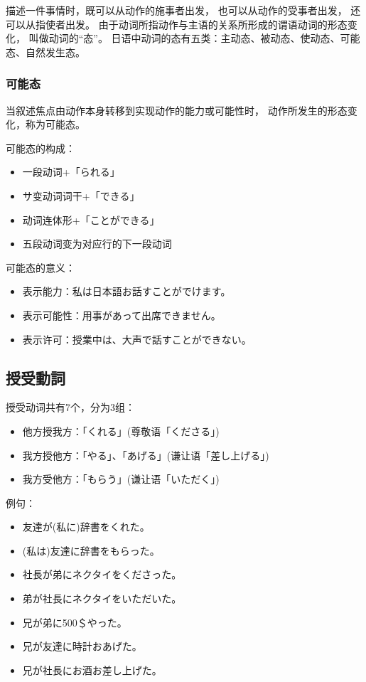 描述一件事情时，既可以从动作的施事者出发，
也可以从动作的受事者出发，
还可以从指使者出发。
由于动词所指动作与主语的关系所形成的谓语动词的形态变化，
叫做动词的``态''。
日语中动词的态有五类：主动态、被动态、使动态、可能态、自然发生态。

\subsubsection{可能态}%

当叙述焦点由动作本身转移到实现动作的能力或可能性时，
动作所发生的形态变化，称为可能态。

可能态的构成：
\begin{itemize}
  \item 一段动词+「られる」
  \item サ变动词词干+「できる」
  \item 动词连体形+「ことができる」
  \item 五段动词变为对应行的下一段动词
\end{itemize}

可能态的意义：
\begin{itemize}
  \item 表示能力：私は日本語お話すことがでけます。
  \item 表示可能性：用事があって出席できません。
  \item 表示许可：授業中は、大声で話すことができない。
\end{itemize}


\subsection{授受動詞}%

授受动词共有7个，分为3组：
\begin{itemize}
  \item 他方授我方：「くれる」(尊敬语「くださる」)
  \item 我方授他方：「やる」、「あげる」(谦让语「差し上げる」)
  \item 我方受他方：「もらう」(谦让语「いただく」)
\end{itemize}

例句：
\begin{itemize}
  \item 友達が(私に)辞書をくれた。
  \item (私は)友達に辞書をもらった。
  \item 社長が弟にネクタイをくださった。
  \item 弟が社長にネクタイをいただいた。
  \item 兄が弟に500＄やった。
  \item 兄が友達に時計おあげた。
  \item 兄が社長にお酒お差し上げた。
\end{itemize}


